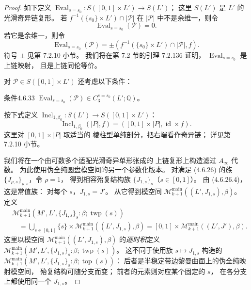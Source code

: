 \begin{proof}
如下定义
$\operatorname{Eval}_{s=s_0}\colon
S([0,1]\times L')\to S(L')$；
这里 $S(L')$ 是 $L'$ 的光滑奇异链复形。
若 $f^{-1}(\{s_0\}\times L')\cap|\mathcal P|$
在 $|\mathcal P|$ 中不是余维一，则令
\begin{equation}
\operatorname{Eval}_{s=s_0}(\mathcal P)=0.
\tag{4.6.32.1}\label{eq:4-6-32-1}
\end{equation}
若它是余维一，则令
\begin{equation}
\operatorname{Eval}_{s=s_0}(\mathcal P)
=\pm(f^{-1}(\{s_0\}\times L')\cap|\mathcal P|,f).
\tag{4.6.32.2}\label{eq:4-6-32-2}
\end{equation}
符号 $\pm$ 见第 7.2.10 小节。
我们将在第 7.2 节的引理 7.2.136 证明，
$\operatorname{Eval}_{s=s_0}$ 是上链映射，
且是上链同伦等价。

对 $\mathcal P\in S([0,1]\times L')$
还考虑以下条件：
\begin{statement}{条件}{4.6.33}\label{cond:4-6-33}
$\operatorname{Eval}_{s=s_0}(\mathcal P)
\in C_3^{s=s_0}(L';\mathbb Q)$。
\end{statement}

按下式定义
$\operatorname{Incl}_{1,\beta_0}\colon
S(L')\to S([0,1]\times L')$：
\[
\operatorname{Incl}_{1,\beta_0}(|P|,f)
=([0,1]\times|P|,\operatorname{id}\times f).
\]
这里对 $[0,1]\times|P|$ 取适当的
棱柱型单纯剖分，把右端看作奇异链；
详见第 7.2.10 小节。

我们将在一个由可数多个适配光滑奇异单形张成的
上链复形上构造滤过 $A_\infty$ 代数。
为此使用伪全纯圆盘模空间的另一个参数化版本。
对满足 (4.6.26) 的族
$\{J_{\rho,s}\}_{\rho,s}$，令 $\rho=1$，
得到相容殆复结构族
$\{J_{1,s}\}_s$（$s\in[0,1]$）。
由 (4.6.26.4)，这是常值族：
对每个 $s$，$J_{1,s}=J'$。
从它得到模空间
$\mathcal M_{k+1}^{\mathrm{main}}((L',J_{1,s}),\beta)$。
定义
\begin{equation}
\begin{aligned}
&\mathcal M_{k+1}^{\mathrm{main}}
(M',L',\{J_{1,s}\}_s:\beta;\operatorname{twp}(s))\\
&\quad=
\bigcup_{s\in[0,1]}\{s\}\times
\mathcal M_{k+1}^{\mathrm{main}}((L',J_{1,s}),\beta)
=[0,1]\times
\mathcal M_{k+1}^{\mathrm{main}}((L',J'),\beta).
\end{aligned}
\tag{4.6.34}\label{eq:4-6-34}
\end{equation}
这里以模空间
$\mathcal M_{k+1}^{\mathrm{main}}((L',J_{1,s}),\beta)$
的\emph{逐时积}定义
$\mathcal M_{k+1}^{\mathrm{main}}
(M',L',\{J_{1,s}\}_s:\beta;\operatorname{twp}(s))$。
这不同于使用族 $s\mapsto J_{1,s}$
构造的
$\mathcal M_{k+1}^{\mathrm{main}}
(M',L',\{J_{1,s}\}_s:
\beta;\operatorname{top}(s))$：
后者是半稳定带边黎曼曲面上的伪全纯映射模空间，
殆复结构可随分支而变；
前者的元素则对应某个固定的 $s$，
在各分支上都使用同一个 $J_{1,s}$。


\end{proof}
